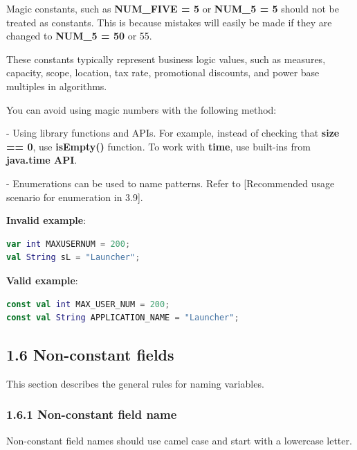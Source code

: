 {{{{{{{{{{{{Magic constants, such as \textbf{NUM_FIVE = 5} or \textbf{NUM_5 = 5} should not be treated as constants. This is because mistakes will easily be made if they are changed to \textbf{NUM_5 = 50} or 55.

These constants typically represent business logic values, such as measures, capacity, scope, location, tax rate, promotional discounts, and power base multiples in algorithms.

You can avoid using magic numbers with the following method:

- Using library functions and APIs. For example, instead of checking that \textbf{size == 0}, use \textbf{isEmpty()} function. To work with \textbf{time}, use built-ins from \textbf{java.time API}.

- Enumerations can be used to name patterns. Refer to [Recommended usage scenario for enumeration in 3.9].



\textbf{Invalid example}: 



\begin{lstlisting}[language=Kotlin]
var int MAXUSERNUM = 200;
val String sL = "Launcher";
\end{lstlisting}


\textbf{Valid example}:



\begin{lstlisting}[language=Kotlin]
const val int MAX_USER_NUM = 200;
const val String APPLICATION_NAME = "Launcher";
\end{lstlisting}


\subsection*{\textbf{1.6 Non-constant fields}}

\label{sec:1.6}

This section describes the general rules for naming variables.

\subsubsection*{\textbf{1.6.1 Non-constant field name}}
\leavevmode\newline

\label{sec:1.6.1}

Non-constant field names should use camel case and start with a lowercase letter.

}}}}}}}}}}}}
